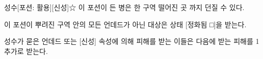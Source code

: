 \documentclass{report}
\begin{document}
	\begin{story}{성수}{[포션: 활용][신성]☆}
		이 포션이 든 병은 한 구역 떨어진 곳 까지 던질 수 있다.
		
		이 포션이 뿌려진 구역 안의 모든 언데드가 아닌 대상은 상태 [정화됨 □]을 받는다.
		
		성수가 묻은 언데드 또는 [신성] 속성에 의해 피해를 받는 이들은 다음에 받는 피해를 1 추가로 받는다.
		
	\end{story}
\end{document}
